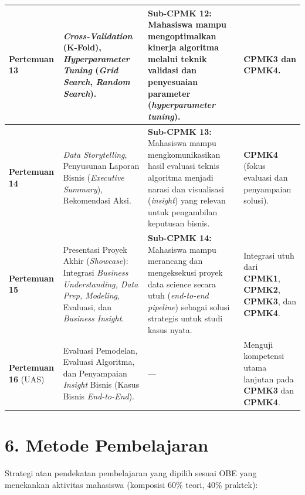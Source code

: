 \documentclass[12pt,a4paper]{article}
\begin{document}
{\begin{longtable}{|>{\raggedright\arraybackslash}p{2.05cm}|>{\raggedright\arraybackslash}p{4.55cm}|>{\raggedright\arraybackslash}p{4.55cm}|>{\raggedright\arraybackslash}p{2.95cm}|}
\textbf{Pertemuan 13} &
\textit{Cross-Validation} (K-Fold), \textit{Hyperparameter Tuning} (\textit{Grid Search}, \textit{Random Search}). &
\textbf{Sub-CPMK 12:} Mahasiswa mampu mengoptimalkan kinerja algoritma melalui teknik validasi dan penyesuaian parameter (\textit{hyperparameter tuning}). &
\textbf{CPMK3} dan \textbf{CPMK4}. \\
\hline

\textbf{Pertemuan 14} &
\textit{Data Storytelling}, Penyusunan Laporan Bisnis (\textit{Executive Summary}), Rekomendasi Aksi. &
\textbf{Sub-CPMK 13:} Mahasiswa mampu mengkomunikasikan hasil evaluasi teknis algoritma menjadi narasi dan visualisasi (\textit{insight}) yang relevan untuk pengambilan keputusan bisnis. &
\textbf{CPMK4} (fokus evaluasi dan penyampaian solusi). \\
\hline

\textbf{Pertemuan 15} &
Presentasi Proyek Akhir (\textit{Showcase}): Integrasi \textit{Business Understanding, Data Prep, Modeling}, Evaluasi, dan \textit{Business Insight}. &
\textbf{Sub-CPMK 14:} Mahasiswa mampu merancang dan mengeksekusi proyek data science secara utuh (\textit{end-to-end pipeline}) sebagai solusi strategis untuk studi kasus nyata. &
Integrasi utuh dari \textbf{CPMK1}, \textbf{CPMK2}, \textbf{CPMK3}, dan \textbf{CPMK4}. \\
\hline

\textbf{Pertemuan 16} (UAS) &
Evaluasi Pemodelan, Evaluasi Algoritma, dan Penyampaian \textit{Insight} Bisnis (Kasus Bisnis \textit{End-to-End}). &
--- &
Menguji kompetensi utama lanjutan pada \textbf{CPMK3} dan \textbf{CPMK4}. \\
\hline
\end{longtable}
}

\vspace{0.5cm}

\section*{6. Metode Pembelajaran}

Strategi atau pendekatan pembelajaran yang dipilih sesuai OBE yang menekankan aktivitas mahasiswa (komposisi 60\% teori, 40\% praktek):
\end{document}
